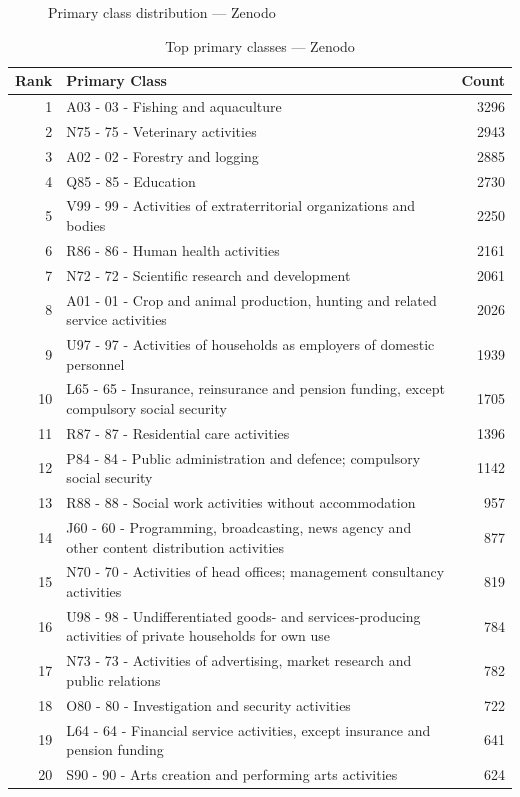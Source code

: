 \begin{figure}[h]
    \centering
    
    \caption{Primary class distribution --- Zenodo}
\end{figure}

\begin{table}[h]
    \centering
    \begin{tabular}{r p{10cm} r}
    \hline
    \textbf{Rank} & \textbf{Primary Class} & \textbf{Count} \\
    \hline
    1 & A03 - 03 - Fishing and aquaculture & 3296 \\
    2 & N75 - 75 - Veterinary activities & 2943 \\
    3 & A02 - 02 - Forestry and logging & 2885 \\
    4 & Q85 - 85 - Education & 2730 \\
    5 & V99 - 99 - Activities of extraterritorial organizations and bodies & 2250 \\
    6 & R86 - 86 - Human health activities & 2161 \\
    7 & N72 - 72 - Scientific research and development & 2061 \\
    8 & A01 - 01 - Crop and animal production, hunting and related service activities & 2026 \\
    9 & U97 - 97 - Activities of households as employers of domestic personnel & 1939 \\
    10 & L65 - 65 - Insurance, reinsurance and pension funding, except compulsory social security & 1705 \\
    11 & R87 - 87 - Residential care activities & 1396 \\
    12 & P84 - 84 - Public administration and defence; compulsory social security & 1142 \\
    13 & R88 - 88 - Social work activities without accommodation & 957 \\
    14 & J60 - 60 - Programming, broadcasting, news agency and other content distribution activities & 877 \\
    15 & N70 - 70 - Activities of head offices; management consultancy activities & 819 \\
    16 & U98 - 98 - Undifferentiated goods- and services-producing activities of private households for own use & 784 \\
    17 & N73 - 73 - Activities of advertising, market research and public relations & 782 \\
    18 & O80 - 80 - Investigation and security activities & 722 \\
    19 & L64 - 64 - Financial service activities, except insurance and pension funding & 641 \\
    20 & S90 - 90 - Arts creation and performing arts activities & 624 \\
    \hline
    \end{tabular}
    \caption{Top primary classes --- Zenodo}
\end{table}

